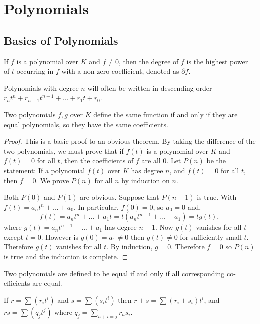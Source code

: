 
\section{Polynomials}
\subsection{Basics of Polynomials}

\begin{definition}
    If $f$ is a polynomial over $K$ and $f \neq 0$, then the degree of $f$ is the highest power of $t$ occurring in $f$ with a non-zero coefficient, denoted as $\partial f$. 
\end{definition}

Polynomials with degree $n$ will often be written in descending order $r_n t^n + r_{n-1} t^{n+1} + ... + r_1 t + r_0$.

\begin{theorem}
    Two polynomials $f,g$ over $K$ define the same function if and only if they are equal polynomials, so they have the same coefficients.
\end{theorem}

\begin{proof}
    This is a basic proof to an obvious theorem. By taking the difference of the two polynomials, we must prove that if $f(t)$ is a polynomial over $K$ and $f(t) = 0$ for all $t$, then the coefficients of $f$ are all 0. Let $P(n)$ be the statement: If a polynomial $f(t)$ over $K$ has degree $n$, and $f(t) = 0$ for all $t$, then $f=0$. We prove $P(n)$ for all $n$ by induction on $n$. 
    
    Both $P(0)$ and $P(1)$ are obvious. Suppose that $P(n-1)$ is true. With $f(t) = a_n t^n +...+ a_0$. In particular, $f(0) = 0$, so $a_0 = 0$ and,
    $$
    f(t) = a_n t^n +...+ a_1 t= t(a_n t^{n-1} +...+ a_1) = tg(t),
    $$
    where $g(t) = a_n t^{n-1} +...+ a_1$ has degree $n-1$. Now $g(t)$ vanishes for all $t$ except $t=0$. However is $g(0) = a_1 \neq 0$ then $g(t) \neq 0$ for sufficiently small $t$. Therefore $g(t)$ vanishes for all $t$. By induction, $g=0$. Therefore $f=0$ so $P(n)$ is true and the induction is complete.
\end{proof}

Two polynomials are defined to be equal if and only if all corresponding co-efficients are equal.

If $r = \sum (r_i t^i)$ and $s = \sum (s_i t^i)$ then $r+s = \sum (r_i + s_i)t^i$, and $rs = \sum (q_j t^j)$ where $q_j = \sum_{h+i=j} r_h s_i$.

